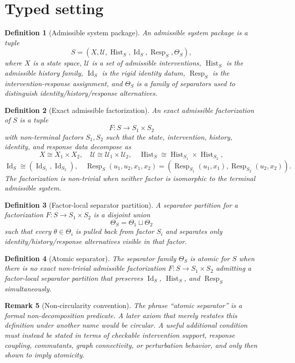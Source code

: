 \documentclass[11pt]{article}
\newtheorem{definition}{Definition}[section]
\newtheorem{remark}[definition]{Remark}
\newcommand{\Id}{\operatorname{Id}}
\newcommand{\Hist}{\operatorname{Hist}}
\newcommand{\Resp}{\operatorname{Resp}}
\begin{document}
\section{Typed setting}

\begin{definition}[Admissible system package]
An admissible system package is a tuple
\[
  S = (X,\mathcal{U},\Hist_S,\Id_S,\Resp_S,\Theta_S),
\]
where $X$ is a state space, $\mathcal{U}$ is a set of admissible interventions, $\Hist_S$ is the admissible history family, $\Id_S$ is the rigid identity datum, $\Resp_S$ is the intervention-response assignment, and $\Theta_S$ is a family of separators used to distinguish identity/history/response alternatives.
\end{definition}

\begin{definition}[Exact admissible factorization]
An exact admissible factorization of $S$ is a tuple
\[
  F:S\longrightarrow S_1\times S_2
\]
with non-terminal factors $S_1,S_2$ such that the state, intervention, history, identity, and response data decompose as
\[
  X\cong X_1\times X_2,
  \quad
  \mathcal U\cong \mathcal U_1\times\mathcal U_2,
  \quad
  \Hist_S\cong \Hist_{S_1}\times\Hist_{S_2},
\]
\[
  \Id_S \cong (\Id_{S_1},\Id_{S_2}),
  \quad
  \Resp_S(u_1,u_2,x_1,x_2)=(\Resp_{S_1}(u_1,x_1),\Resp_{S_2}(u_2,x_2)).
\]
The factorization is non-trivial when neither factor is isomorphic to the terminal admissible system.
\end{definition}

\begin{definition}[Factor-local separator partition]
A separator partition for a factorization $F:S\to S_1\times S_2$ is a disjoint union
\[
  \Theta_S = \Theta_1\sqcup\Theta_2
\]
such that every $\theta\in\Theta_i$ is pulled back from factor $S_i$ and separates only identity/history/response alternatives visible in that factor.
\end{definition}

\begin{definition}[Atomic separator]
The separator family $\Theta_S$ is atomic for $S$ when there is no exact non-trivial admissible factorization $F:S\to S_1\times S_2$ admitting a factor-local separator partition that preserves $\Id_S$, $\Hist_S$, and $\Resp_S$ simultaneously.
\end{definition}

\begin{remark}[Non-circularity convention]
The phrase ``atomic separator'' is a formal non-decomposition predicate. A later axiom that merely restates this definition under another name would be circular. A useful additional condition must instead be stated in terms of checkable intervention support, response coupling, commutants, graph connectivity, or perturbation behavior, and only then shown to imply atomicity.
\end{remark}
\end{document}
